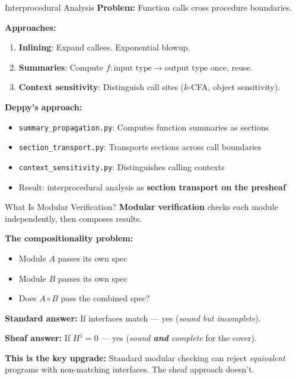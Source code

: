 \documentclass[aspectratio=169,10pt]{beamer}
\begin{document}
\begin{frame}{Interprocedural Analysis}
\textbf{Problem:} Function calls cross procedure boundaries.

\textbf{Approaches:}
\begin{enumerate}
  \item \textbf{Inlining}: Expand callees. Exponential blowup.
  \item \textbf{Summaries}: Compute $f : \text{input type} \to \text{output type}$ once, reuse.
  \item \textbf{Context sensitivity}: Distinguish call sites ($k$-CFA, object sensitivity).
\end{enumerate}

\vspace{0.5em}
\textbf{Deppy's approach:}
\begin{itemize}
  \item \texttt{summary\_propagation.py}: Computes function summaries as sections
  \item \texttt{section\_transport.py}: Transports sections across call boundaries
  \item \texttt{context\_sensitivity.py}: Distinguishes calling contexts
  \item Result: interprocedural analysis as \textbf{section transport on the presheaf}
\end{itemize}
\end{frame}

\begin{frame}{What Is Modular Verification?}
\textbf{Modular verification} checks each module independently, then composes results.

\vspace{0.3em}
\textbf{The compositionality problem:}
\begin{itemize}
  \item Module $A$ passes its own spec
  \item Module $B$ passes its own spec
  \item Does $A \circ B$ pass the combined spec?
\end{itemize}

\vspace{0.3em}
\textbf{Standard answer:} If interfaces match --- yes (\emph{sound but incomplete}).

\textbf{Sheaf answer:} If $H^1 = 0$ --- yes (\emph{sound \textbf{and} complete} for the cover).

\vspace{0.5em}
\textcolor{honest}{\textbf{This is the key upgrade:}} Standard modular checking can reject \emph{equivalent} programs with non-matching interfaces. The sheaf approach doesn't.
\end{frame}
\end{document}
